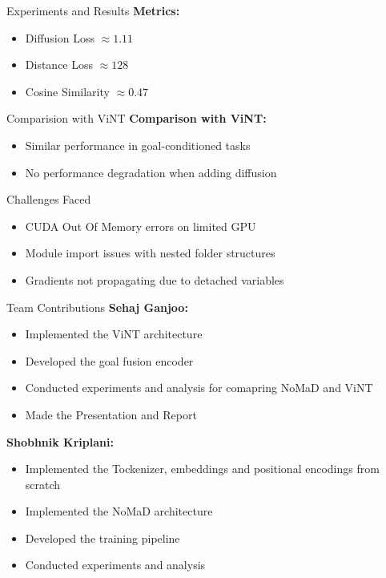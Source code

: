 \documentclass{beamer}
\begin{document}
\begin{frame}{Experiments and Results}
\textbf{Metrics:}
\begin{itemize}
    \item Diffusion Loss $\approx 1.11$
    \item Distance Loss $\approx 128$
    \item Cosine Similarity $\approx 0.47$
\end{itemize}
\end{frame}


\begin{frame}{Comparision with ViNT}
    \textbf{Comparison with ViNT:}
\begin{itemize}
    \item Similar performance in goal-conditioned tasks
    \item No performance degradation when adding diffusion
\end{itemize}
\end{frame}
\begin{frame}{Challenges Faced}
\begin{itemize}
    \item CUDA Out Of Memory errors on limited GPU
    \item Module import issues with nested folder structures
    \item Gradients not propagating due to detached variables
\end{itemize}
\end{frame}

\begin{frame}{Team Contributions}
    \textbf{Sehaj Ganjoo:} \\
    \begin{itemize}
        \item Implemented the ViNT architecture
        \item Developed the goal fusion encoder
        \item Conducted experiments and analysis for comapring NoMaD and ViNT
        \item Made the Presentation and Report
    \end{itemize}
    \textbf{Shobhnik Kriplani:} \\
    \begin{itemize}
        \item Implemented the Tockenizer, embeddings and positional encodings from scratch
        \item Implemented the NoMaD architecture
        \item Developed the training pipeline
        \item Conducted experiments and analysis
    \end{itemize}
\end{frame}
\end{document}
